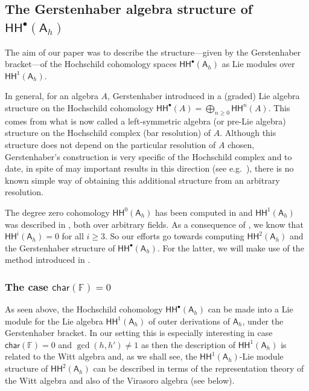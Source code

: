 \documentclass{commat}
\newcommand{\FF}{\mathbb{F}}
\newcommand{\A}{\mathsf{A}}
\newcommand\chara{\mathsf {char}}
\newcommand\hoch{\mathsf{HH}}
\begin{document}
\subsection{The Gerstenhaber algebra structure of \texorpdfstring{$\hoch^\bullet(\A_h)$}{HH.Ah}}\label{SS:hh:gerst}

The aim of our paper \cite{LS21} was to describe the structure---given by the Gerstenhaber bracket---of the Hochschild cohomology spaces $\hoch^\bullet(\A_h)$  as Lie modules over $\hoch^1(\A_h)$.

In general, for an algebra $A$, Gerstenhaber introduced in \cite{mG64} a (graded) Lie algebra structure on the Hochschild cohomology $\hoch^{\bullet}(A)=\bigoplus_{n\geq 0}\hoch^n(A)$. This comes from what is now called a left-symmetric algebra (or pre-Lie algebra) structure on the Hochschild complex (bar resolution) of $A$. Although this structure does not depend on the particular resolution of $A$ chosen, Gerstenhaber's construction is very specific of the Hochschild complex and to date, in spite of may important results in this direction (see e.g.\ \cite{sW19,mSA17,yV19,NW16}), there is no known simple way of obtaining this additional structure from an arbitrary resolution.

The degree zero cohomology $\hoch^0(\A_h)$ has been computed in \cite[Section 5]{BLO15tams} and $\hoch^1(\A_h)$ was described in \cite{BLO15ja}, both over arbitrary fields. As a consequence of \cite[Sec.\ 3]{LS21}, we know that $\hoch^i(\A_h) =0$ for all $i\geq 3$. So our efforts go towards computing $\hoch^2(\A_h)$ and the Gerstenhaber structure of $\hoch^{\bullet}(\A_h)$. For the latter, we will make use of the method introduced in \cite{mSA17}.

\subsubsection{The case \texorpdfstring{$\chara(\FF)=0$}{char(F)=0}}\label{SSS:hh:gerst:char0}

As seen above, the Hochschild cohomology $\hoch^{\bullet}(\A_h)$ can be made into a Lie module for the Lie algebra $\hoch^{1}(\A_h)$ of outer derivations of $\A_h$, under the Gerstenhaber bracket. In our setting this is especially interesting in case $\chara(\FF)=0$ and $\gcd(h, h')\neq 1$ as then the description of $\hoch^{1}(\A_h)$ is related to the Witt algebra and, as we shall see, the $\hoch^{1}(\A_h)$-Lie module structure of $\hoch^{2}(\A_h)$ can be described in terms of the representation theory of the Witt algebra and also of the Virasoro algebra (see below).
\end{document}
